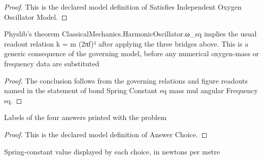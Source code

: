 \begin{proof}
  This is the declared model definition of Satisfies Independent Oxygen Oscillator Model.
\end{proof}
\begin{lemma}
  \label{lem:physics:phyx-mini-0207:phyxminiproblems-problemphyxmini0207-bondspringconstant-eq-mass-mul-angularfrequency-sq}
  Physlib's theorem ClassicalMechanics.HarmonicOscillator.ω\_sq implies the usual readout relation k = m (2πf)² after applying the three bridges above. This is a generic consequence of the governing model, before any numerical oxygen-mass or frequency data are substituted
\end{lemma}
\begin{proof}
  The conclusion follows from the governing relations and figure readouts named in the statement of bond Spring Constant eq mass mul angular Frequency sq.
\end{proof}
\begin{definition}
  \label{def:physics:phyx-mini-0207:phyxminiproblems-problemphyxmini0207-answerchoice}
  Labels of the four answers printed with the problem
\end{definition}
\begin{proof}
  This is the declared model definition of Answer Choice.
\end{proof}
\begin{definition}
  \label{def:physics:phyx-mini-0207:phyxminiproblems-problemphyxmini0207-displayedspringconstantinnewtonspermeter}
  Spring-constant value displayed by each choice, in newtons per metre
\end{definition}
